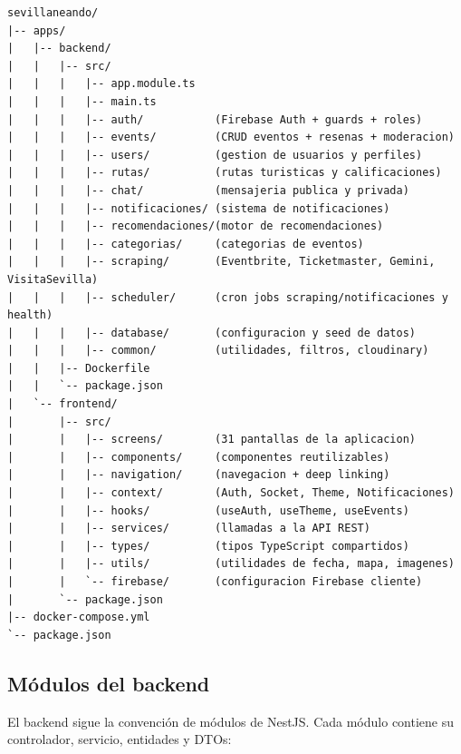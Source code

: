 \begin{lstlisting}[basicstyle=\ttfamily\small, breaklines=true, breakatwhitespace=false, columns=flexible]
sevillaneando/
|-- apps/
|   |-- backend/
|   |   |-- src/
|   |   |   |-- app.module.ts
|   |   |   |-- main.ts
|   |   |   |-- auth/           (Firebase Auth + guards + roles)
|   |   |   |-- events/         (CRUD eventos + resenas + moderacion)
|   |   |   |-- users/          (gestion de usuarios y perfiles)
|   |   |   |-- rutas/          (rutas turisticas y calificaciones)
|   |   |   |-- chat/           (mensajeria publica y privada)
|   |   |   |-- notificaciones/ (sistema de notificaciones)
|   |   |   |-- recomendaciones/(motor de recomendaciones)
|   |   |   |-- categorias/     (categorias de eventos)
|   |   |   |-- scraping/       (Eventbrite, Ticketmaster, Gemini, VisitaSevilla)
|   |   |   |-- scheduler/      (cron jobs scraping/notificaciones y health)
|   |   |   |-- database/       (configuracion y seed de datos)
|   |   |   |-- common/         (utilidades, filtros, cloudinary)
|   |   |-- Dockerfile
|   |   `-- package.json
|   `-- frontend/
|       |-- src/
|       |   |-- screens/        (31 pantallas de la aplicacion)
|       |   |-- components/     (componentes reutilizables)
|       |   |-- navigation/     (navegacion + deep linking)
|       |   |-- context/        (Auth, Socket, Theme, Notificaciones)
|       |   |-- hooks/          (useAuth, useTheme, useEvents)
|       |   |-- services/       (llamadas a la API REST)
|       |   |-- types/          (tipos TypeScript compartidos)
|       |   |-- utils/          (utilidades de fecha, mapa, imagenes)
|       |   `-- firebase/       (configuracion Firebase cliente)
|       `-- package.json
|-- docker-compose.yml
`-- package.json
\end{lstlisting}

\subsection{Módulos del backend}

El backend sigue la convención de módulos de NestJS. Cada módulo contiene su controlador, servicio, entidades y DTOs:

